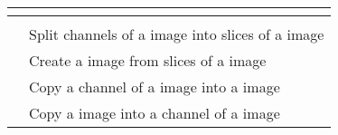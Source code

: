 
%
%
%
\begin{table}[h!]
  \centering
  \begin{tabularx}{\linewidth}{|l|Y|}
    \toprule
      \\
    \toprule
                                     &  \\
    \hline \hline
             & Split channels of a  image into slices of a  image \\
    \hline
             & Create a  image from slices of a  image \\
    \hline
       & Copy a channel of a  image into a  image \\
    \hline
     & Copy a  image into a channel of a  image \\
    \hline
  \end{tabularx}
\end{table}

